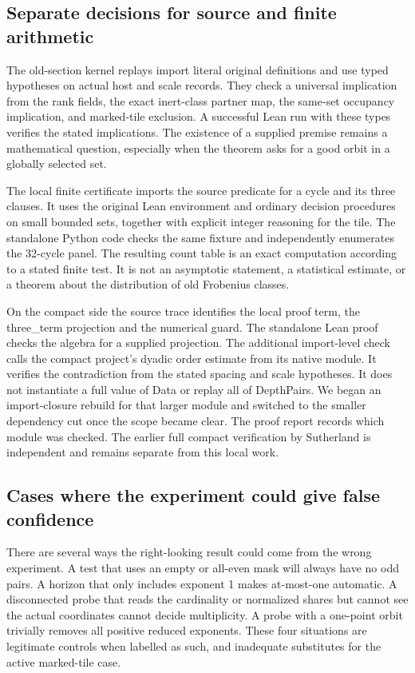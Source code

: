 \documentclass[12pt,letterpaper]{article}
\DeclareRobustCommand{\id}[1]{\mbox{\small\ttfamily #1}}
\begin{document}
\subsection{Separate decisions for source and finite arithmetic}

The old-section kernel replays import literal original definitions and use typed hypotheses on actual host and scale records. They check a universal implication from the rank fields, the exact inert-class partner map, the same-set occupancy implication, and marked-tile exclusion. A successful Lean run with these types verifies the stated implications. The existence of a supplied premise remains a mathematical question, especially when the theorem asks for a good orbit in a globally selected set.

The local finite certificate imports the source predicate for a cycle and its three clauses. It uses the original Lean environment and ordinary decision procedures on small bounded sets, together with explicit integer reasoning for the tile. The standalone Python code checks the same fixture and independently enumerates the 32-cycle panel. The resulting count table is an exact computation according to a stated finite test. It is not an asymptotic statement, a statistical estimate, or a theorem about the distribution of old Frobenius classes.

On the compact side the source trace identifies the local proof term, the \id{three\_term} projection and the numerical guard. The standalone Lean proof checks the algebra for a supplied projection. The additional import-level check calls the compact project's dyadic order estimate from its native module. It verifies the contradiction from the stated spacing and scale hypotheses. It does not instantiate a full value of \id{Data} or replay all of \id{DepthPairs}. We began an import-closure rebuild for that larger module and switched to the smaller dependency cut once the scope became clear. The proof report records which module was checked. The earlier full compact verification by Sutherland is independent and remains separate from this local work.

\subsection{Cases where the experiment could give false confidence}

There are several ways the right-looking result could come from the wrong experiment. A test that uses an empty or all-even mask will always have no odd pairs. A horizon that only includes exponent 1 makes at-most-one automatic. A disconnected probe that reads the cardinality or normalized shares but cannot see the actual coordinates cannot decide multiplicity. A probe with a one-point orbit trivially removes all positive reduced exponents. These four situations are legitimate controls when labelled as such, and inadequate substitutes for the active marked-tile case.
\end{document}
